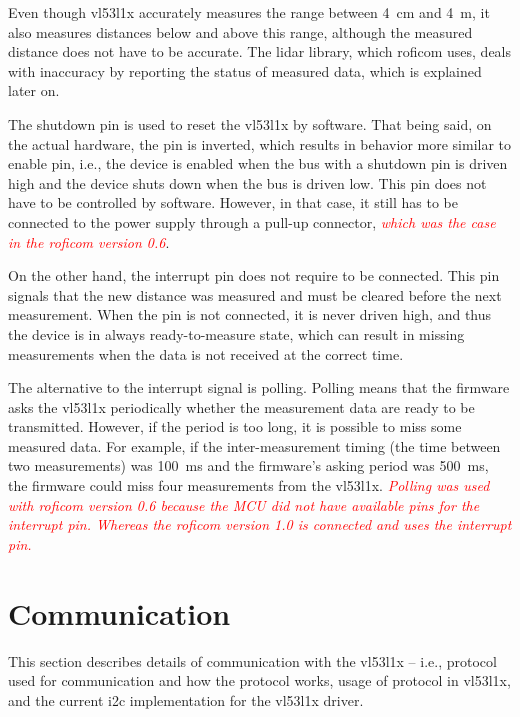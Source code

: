 \documentclass[
  digital,     %
  oneside,     %
  nosansbold,  %
  nocolorbold, %
  lof,         %
  lot,         %
]{fithesis4}
\newcommand{\TODO}[1]{\textcolor{red}{\textit{#1}}}
\begin{document}
{{{Even though \gls{vl53l1x} accurately measures the range between \qty{4}{\centi\metre} and \qty{4}{\metre}, it also measures distances below and above this range, although the measured distance does not have to be accurate. The lidar library, which \acrshort{roficom} uses, deals with inaccuracy by reporting the status of measured data, which is explained later on.

The shutdown pin is used to reset the \gls{vl53l1x} by software. That being said, on the actual hardware, the pin is inverted, which results in behavior more similar to enable pin, i.e., the device is enabled when the bus with a shutdown pin is driven high and the device shuts down when the bus is driven low. This pin does not have to be controlled by software. However, in that case, it still has to be connected to the power supply through a pull-up connector, \TODO{which was the case in the \acrshort{roficom} version 0.6}.

On the other hand, the interrupt pin does not require to be connected. This pin signals that the new distance was measured and must be cleared before the next measurement. When the pin is not connected, it is never driven high, and thus the device is in always ready-to-measure state, which can result in missing measurements when the data is not received at the correct time.

The alternative to the interrupt signal is polling. Polling means that the firmware asks the \gls{vl53l1x} periodically whether the measurement data are ready to be transmitted. However, if the period is too long, it is possible to miss some measured data. For example, if the inter-measurement timing (the time between two measurements) was \qty{100}{\milli\second} and the firmware's asking period was \qty{500}{\milli\second}, the firmware could miss four measurements from the \gls{vl53l1x}. \TODO{Polling was used with \acrshort{roficom} version 0.6 because the MCU did not have available pins for the interrupt pin. Whereas the \acrshort{roficom} version 1.0 is connected and uses the interrupt pin.}

\section{ Communication }
This section describes details of communication with the \gls{vl53l1x} -- i.e., protocol used for communication and how the protocol works, usage of protocol in \gls{vl53l1x}, and the current \acrshort{i2c} implementation for the \gls{vl53l1x} driver. 

}}}
\end{document}
